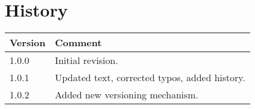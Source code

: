 \chapter{History}

\begin{tabular}{|p{}|p{}|}
\hline 
Version&
Comment\tabularnewline
\hline
\hline 
1.0.0&
Initial revision.\tabularnewline
\hline 
1.0.1&
Updated text, corrected typos, added history.
\tabularnewline
1.0.2&
Added new versioning mechanism.
\tabularnewline
\hline
\end{tabular}
